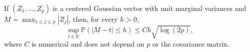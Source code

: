 If \((Z_1,\ldots,Z_p)\) is a centered Gaussian vector with unit marginal variances and \(M=\max_{1\leq j\leq p}|Z_j|\), then, for every \(h>0\),
\[
 \sup_{t\in\mathbb R}\mathbb P(|M-t|\leq h)
 \leq Ch\sqrt{\log(2p)},
\]
where \(C\) is numerical and does not depend on \(p\) or the covariance matrix.